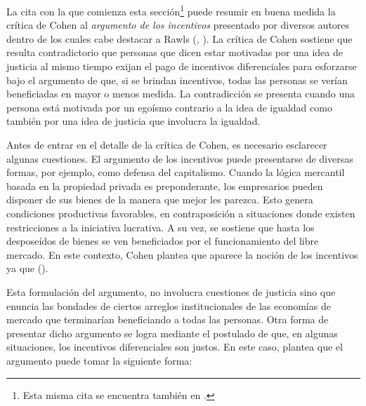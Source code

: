 La cita con la que comienza esta sección\footnote{Esta misma cita se encuentra también en \citet{Cohen_2008}.} puede resumir en buena medida la crítica de Cohen al \textit{argumento de los incentivos} presentado por diversos autores dentro de los cuales cabe destacar a Rawls (\citeyear{Rawls_1971}, \citeyear{Rawls_2002}). La crítica de Cohen sostiene que resulta contradictorio que personas que dicen estar motivadas por una idea de justicia al mismo tiempo exijan el pago de incentivos diferenciales para esforzarse bajo el argumento de que, si se brindan incentivos, todas las personas se verían beneficiadas en mayor o menos medida. La contradicción se presenta cuando una persona está motivada por un egoísmo contrario a la idea de igualdad como también por una idea de justicia que involucra la igualdad.  

Antes de entrar en el detalle de la crítica de Cohen, es necesario esclarecer algunas cuestiones. El argumento de los incentivos puede presentarse de diversas formas, por ejemplo, como defensa del capitalismo. Cuando la lógica mercantil basada en la propiedad privada es preponderante, los empresarios pueden disponer de sus bienes de la manera que mejor les parezca. Esto genera condiciones productivas favorables, en contraposición a situaciones donde existen restricciones a la iniciativa lucrativa. A su vez, se sostiene que hasta los desposeídos de bienes se ven beneficiados por el funcionamiento del libre mercado. En este contexto, Cohen plantea que aparece la noción de los incentivos ya que  (\citeyear[p. 29]{Cohen_2014a}).

Esta formulación del argumento, no involucra cuestiones de justicia sino que enuncia las bondades de ciertos arreglos institucionales de las economías de mercado que terminarían beneficiando a todas las personas. Otra forma de presentar dicho argumento se logra mediante el postulado de que, en algunas situaciones, los incentivos diferenciales son justos. En este caso, \citet[p. 19]{Cohen_2008} plantea que el argumento puede tomar la siguiente forma:

